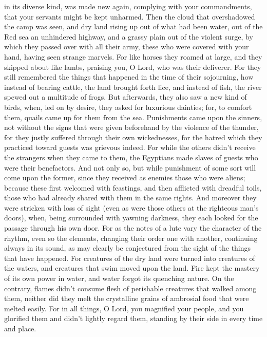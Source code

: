in its diverse kind, was made new again, complying with your
commandments, that your servants might be kept unharmed. 
Then the cloud that overshadowed the camp was seen, and dry land rising
up out of what had been water, out of the Red sea an unhindered highway,
and a grassy plain out of the violent surge,  by which
they passed over with all their army, these who were covered with your
hand, having seen strange marvels.  For like horses they
roamed at large, and they skipped about like lambs, praising you, O
Lord, who was their deliverer.  For they still remembered
the things that happened in the time of their sojourning, how instead of
bearing cattle, the land brought forth lice, and instead of fish, the
river spewed out a multitude of frogs.  But afterwards,
they also saw a new kind of birds, when, led on by desire, they asked
for luxurious dainties;  for, to comfort them, quails
came up for them from the sea.  Punishments came upon the
sinners, not without the signs that were given beforehand by the
violence of the thunder, for they justly suffered through their own
wickednesses, for the hatred which they practiced toward guests was
grievous indeed.  For while the others didn't receive the
strangers when they came to them, the Egyptians made slaves of guests
who were their benefactors.  And not only so, but while
punishment of some sort will come upon the former, since they received
as enemies those who were aliens;  because these first
welcomed with feastings, and then afflicted with dreadful toils, those
who had already shared with them in the same rights.  And
moreover they were stricken with loss of sight (even as were those
others at the righteous man's doors), when, being surrounded with
yawning darkness, they each looked for the passage through his own door.
 For as the notes of a lute vary the character of the
rhythm, even so the elements, changing their order one with another,
continuing always in its sound, as may clearly be conjectured from the
sight of the things that have happened.  For creatures of
the dry land were turned into creatures of the waters, and creatures
that swim moved upon the land.  Fire kept the mastery of
its own power in water, and water forgot its quenching nature.
 On the contrary, flames didn't consume flesh of
perishable creatures that walked among them, neither did they melt the
crystalline grains of ambrosial food that were melted easily.
 For in all things, O Lord, you magnified your people,
and you glorified them and didn't lightly regard them, standing by their
side in every time and place.
